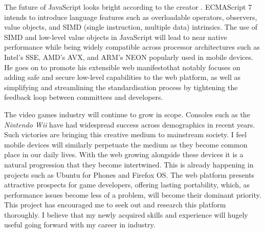 \documentclass[final]{cmpreport}
\begin{document}
The future of JavaScript looks bright according to the creator \citet{Eich}. ECMAScript 7 intends to introduce language features such as overloadable operators, observers, value objects, and SIMD (single instruction, multiple data) intrinsics. The use of SIMD and low-level value objects in JavaScript will lead to near native performance while being widely compatible across processor architectures such as Intel's SSE, AMD's AVX, and ARM's NEON popularly used in mobile devices. He goes on to promote his extensible web manifesto\footnotemark that notably focuses on adding safe and secure low-level capabilities to the web platform, as well as simplifying and streamlining the standardisation process by tightening the feedback loop between committees and developers.


The video games industry will continue to grow in scope. Consoles such as the \textit{Nintendo Wii} have had widespread success across demographics in recent years. Such victories are bringing this creative medium to mainstream society. I feel mobile devices will similarly perpetuate the medium as they become common place in our daily lives. With the web growing alongside these devices it is a natural progression that they become intertwined. This is already happening in projects such as Ubuntu for Phones and Firefox OS. The web platform presents attractive prospects for game developers, offering lasting portability, which, as performance issues become less of a problem, will become their dominant priority. This project has encouraged me to seek out and research this platform thoroughly. I believe that my newly acquired skills and experience will hugely useful going forward with my career in industry.

\clearpage

\end{document}
